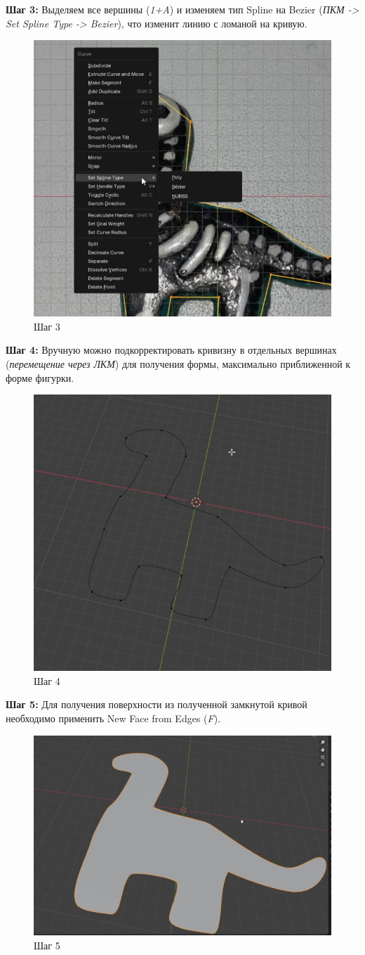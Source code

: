 \documentclass[areasetadvanced]{scrartcl}
\begin{document}
\par \textbf{Шаг 3:} Выделяем все вершины (\textit{1+A}) и изменяем тип Spline на Bezier (\textit{ПКМ -> Set Spline Type -> Bezier}), что изменит линию с ломаной на кривую.
\begin{figure}[H]
    \label{4} 
    \centering
    \includegraphics[width=0.6\linewidth]{dino/3.png}
    \caption{Шаг 3}
\end{figure}

\par \textbf{Шаг 4:} Вручную можно подкорректировать кривизну в отдельных вершинах (\textit{перемещение через ЛКМ}) для получения формы, максимально приближенной к форме фигурки.
\begin{figure}[H]
    \label{4} 
    \centering
    \includegraphics[width=0.6\linewidth]{dino/4.png}
    \caption{Шаг 4}
\end{figure}

\par \textbf{Шаг 5:} Для получения поверхности из полученной замкнутой кривой необходимо применить New Face from Edges (\textit{F}).
\begin{figure}[H]
    \label{4} 
    \centering
    \includegraphics[width=0.6\linewidth]{dino/5.png}
    \caption{Шаг 5}
\end{figure}
\end{document}
